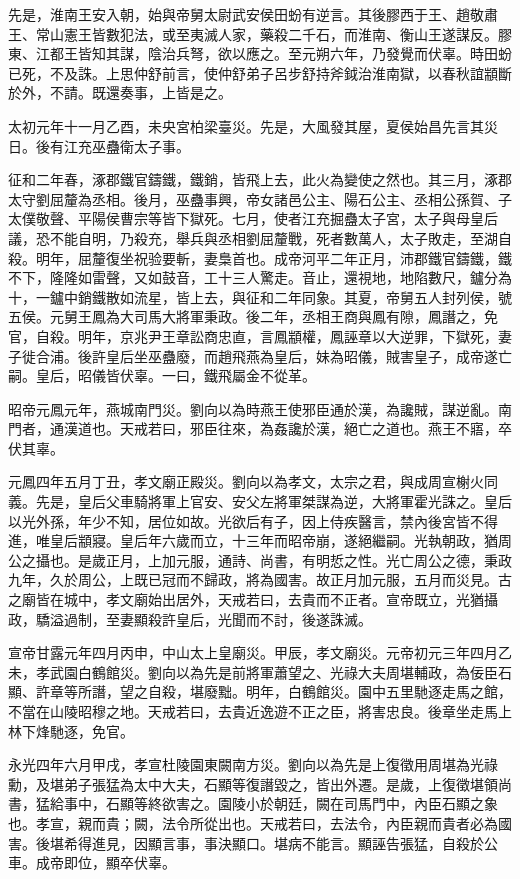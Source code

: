 \begin{pinyinscope}
先是，淮南王安入朝，始與帝舅太尉武安侯田蚡有逆言。其後膠西于王、趙敬肅王、常山憲王皆數犯法，或至夷滅人家，藥殺二千石，而淮南、衡山王遂謀反。膠東、江都王皆知其謀，陰治兵弩，欲以應之。至元朔六年，乃發覺而伏辜。時田蚡已死，不及誅。上思仲舒前言，使仲舒弟子呂步舒持斧鉞治淮南獄，以春秋誼顓斷於外，不請。既還奏事，上皆是之。

太初元年十一月乙酉，未央宮柏梁臺災。先是，大風發其屋，夏侯始昌先言其災日。後有江充巫蠱衛太子事。

征和二年春，涿郡鐵官鑄鐵，鐵銷，皆飛上去，此火為變使之然也。其三月，涿郡太守劉屈釐為丞相。後月，巫蠱事興，帝女諸邑公主、陽石公主、丞相公孫賀、子太僕敬聲、平陽侯曹宗等皆下獄死。七月，使者江充掘蠱太子宮，太子與母皇后議，恐不能自明，乃殺充，舉兵與丞相劉屈釐戰，死者數萬人，太子敗走，至湖自殺。明年，屈釐復坐祝验要斬，妻梟首也。成帝河平二年正月，沛郡鐵官鑄鐵，鐵不下，隆隆如雷聲，又如鼓音，工十三人驚走。音止，還視地，地陷數尺，鑪分為十，一鑪中銷鐵散如流星，皆上去，與征和二年同象。其夏，帝舅五人封列侯，號五侯。元舅王鳳為大司馬大將軍秉政。後二年，丞相王商與鳳有隙，鳳譖之，免官，自殺。明年，京兆尹王章訟商忠直，言鳳顓權，鳳誣章以大逆罪，下獄死，妻子徙合浦。後許皇后坐巫蠱廢，而趙飛燕為皇后，妹為昭儀，賊害皇子，成帝遂亡嗣。皇后，昭儀皆伏辜。一曰，鐵飛屬金不從革。

昭帝元鳳元年，燕城南門災。劉向以為時燕王使邪臣通於漢，為讒賊，謀逆亂。南門者，通漢道也。天戒若曰，邪臣往來，為姦讒於漢，絕亡之道也。燕王不寤，卒伏其辜。

元鳳四年五月丁丑，孝文廟正殿災。劉向以為孝文，太宗之君，與成周宣榭火同義。先是，皇后父車騎將軍上官安、安父左將軍桀謀為逆，大將軍霍光誅之。皇后以光外孫，年少不知，居位如故。光欲后有子，因上侍疾醫言，禁內後宮皆不得進，唯皇后顓寢。皇后年六歲而立，十三年而昭帝崩，遂絕繼嗣。光執朝政，猶周公之攝也。是歲正月，上加元服，通詩、尚書，有明悊之性。光亡周公之德，秉政九年，久於周公，上既已冠而不歸政，將為國害。故正月加元服，五月而災見。古之廟皆在城中，孝文廟始出居外，天戒若曰，去貴而不正者。宣帝既立，光猶攝政，驕溢過制，至妻顯殺許皇后，光聞而不討，後遂誅滅。

宣帝甘露元年四月丙申，中山太上皇廟災。甲辰，孝文廟災。元帝初元三年四月乙未，孝武園白鶴館災。劉向以為先是前將軍蕭望之、光祿大夫周堪輔政，為佞臣石顯、許章等所譖，望之自殺，堪廢黜。明年，白鶴館災。園中五里馳逐走馬之館，不當在山陵昭穆之地。天戒若曰，去貴近逸遊不正之臣，將害忠良。後章坐走馬上林下烽馳逐，免官。

永光四年六月甲戌，孝宣杜陵園東闕南方災。劉向以為先是上復徵用周堪為光祿勳，及堪弟子張猛為太中大夫，石顯等復譖毀之，皆出外遷。是歲，上復徵堪領尚書，猛給事中，石顯等終欲害之。園陵小於朝廷，闕在司馬門中，內臣石顯之象也。孝宣，親而貴；闕，法令所從出也。天戒若曰，去法令，內臣親而貴者必為國害。後堪希得進見，因顯言事，事決顯口。堪病不能言。顯誣告張猛，自殺於公車。成帝即位，顯卒伏辜。


\end{pinyinscope}
